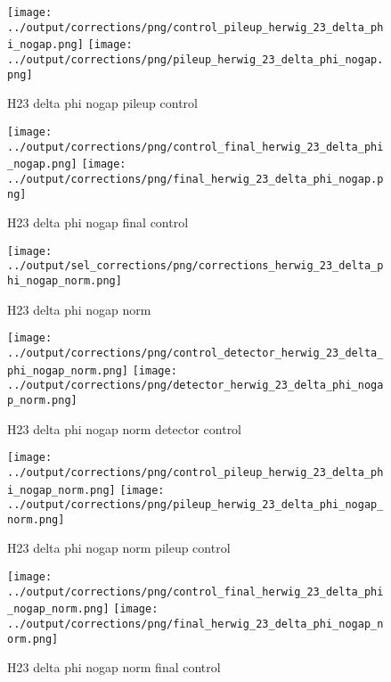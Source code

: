 \documentclass[11pt]{book}
\begin{document}
\begin{figure}[ht]
\centering
\texttt{[image: ../output/corrections/png/control\_pileup\_herwig\_23\_delta\_phi\_nogap.png]}
\texttt{[image: ../output/corrections/png/pileup\_herwig\_23\_delta\_phi\_nogap.png]}
\caption{H23 delta phi nogap pileup control}
\label{fig:H23_delta_phi_nogap_pileup_control}
\end{figure}


\begin{figure}[ht]
\centering
\texttt{[image: ../output/corrections/png/control\_final\_herwig\_23\_delta\_phi\_nogap.png]}
\texttt{[image: ../output/corrections/png/final\_herwig\_23\_delta\_phi\_nogap.png]}
\caption{H23 delta phi nogap final control}
\label{fig:H23_delta_phi_nogap_final_control}
\end{figure}


\begin{figure}[ht]
\centering
\texttt{[image: ../output/sel\_corrections/png/corrections\_herwig\_23\_delta\_phi\_nogap\_norm.png]}
\caption{H23 delta phi nogap norm}
\label{fig:H23_delta_phi_nogap_norm}
\end{figure}

\begin{figure}[ht]
\centering
\texttt{[image: ../output/corrections/png/control\_detector\_herwig\_23\_delta\_phi\_nogap\_norm.png]}
\texttt{[image: ../output/corrections/png/detector\_herwig\_23\_delta\_phi\_nogap\_norm.png]}
\caption{H23 delta phi nogap norm detector control}
\label{fig:H23_delta_phi_nogap_norm_detector_control}
\end{figure}

\begin{figure}[ht]
\centering
\texttt{[image: ../output/corrections/png/control\_pileup\_herwig\_23\_delta\_phi\_nogap\_norm.png]}
\texttt{[image: ../output/corrections/png/pileup\_herwig\_23\_delta\_phi\_nogap\_norm.png]}
\caption{H23 delta phi nogap norm pileup control}
\label{fig:H23_delta_phi_nogap_norm_pileup_control}
\end{figure}


\begin{figure}[ht]
\centering
\texttt{[image: ../output/corrections/png/control\_final\_herwig\_23\_delta\_phi\_nogap\_norm.png]}
\texttt{[image: ../output/corrections/png/final\_herwig\_23\_delta\_phi\_nogap\_norm.png]}
\caption{H23 delta phi nogap norm final control}
\label{fig:H23_delta_phi_nogap_norm_final_control}
\end{figure}
\end{document}
